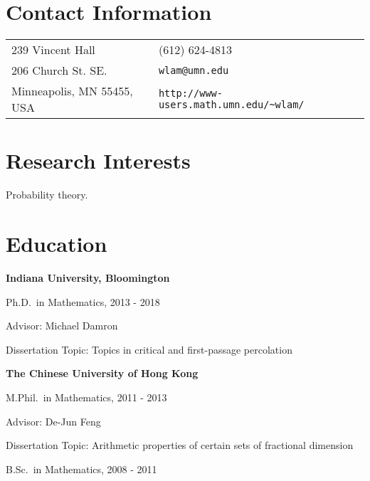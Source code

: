 \documentclass[margin,line,pifont,palatino,courier]{res}
\newenvironment{list1}{
  \begin{list}{\ding{113}}{%
      \setlength{\itemsep}{0in}
      \setlength{\parsep}{0in} \setlength{\parskip}{0in}
      \setlength{\topsep}{0in} \setlength{\partopsep}{0in}
      \setlength{\leftmargin}{0.17in}}}{\end{list}}
\begin{document}

\begin{resume}

\section{\sc Contact Information}

\vspace{.05in}
\begin{tabular}{@{}p{2.75in}p{2in}}
239 Vincent Hall  & (612) 624-4813 \\
206 Church St. SE.                    & \verb+wlam@umn.edu+\\
Minneapolis, MN 55455, USA               & \verb+http://www-users.math.umn.edu/~wlam/+\\
\end{tabular}

\section{\sc Research Interests}
Probability theory.

\section{\sc Education}

{\bf Indiana University, Bloomington}\\
\vspace*{-.1in}
\begin{list1}
\item[] Ph.D.~in Mathematics, 2013 - 2018 

\begin{list1}
\vspace*{.05in}
\item[] Advisor:  Michael Damron
\item[] Dissertation Topic: Topics in critical and first-passage percolation
\end{list1}
\end{list1}

{\bf The Chinese University of Hong Kong}\\
\vspace*{-.1in}
\begin{list1}
\item[] M.Phil.~in Mathematics, 2011 - 2013
\begin{list1}
\vspace*{.05in}
\item[] Advisor:  De-Jun Feng
\item[] Dissertation Topic: Arithmetic properties of certain sets of fractional dimension\\
\end{list1}
\item[] B.Sc.~in Mathematics, 2008 - 2011


\end{list1}
\end{resume}
\end{document}
